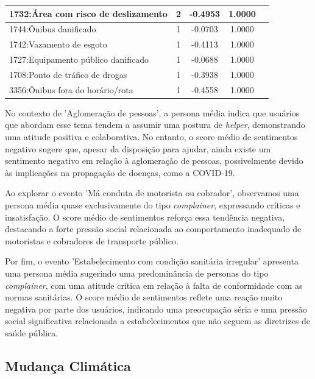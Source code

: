 \begin{table}[htbp]
\begin{tabular}{|l|c|c|c|c|}
		\hline
		1732:Área com risco de deslizamento                   & 2                & -0.4953        & 1.0000           \\
		\hline
		1744:Ônibus danificado                                & 1                & -0.0703        & 1.0000           \\
		\hline
		1742:Vazamento de esgoto                              & 1                & -0.4113        & 1.0000           \\
		\hline
		1727:Equipamento público danificado                   & 1                & -0.0688        & 1.0000           \\
		\hline
		1708:Ponto de tráfico de drogas                       & 1                & -0.3938        & 1.0000           \\
		\hline
		3356:Ônibus fora do horário/rota                      & 1                & -0.4558        & 1.0000           \\
		\hline
	\end{tabular}
\end{table}

No contexto de 'Aglomeração de pessoas', a persona média indica que usuários que abordam esse tema tendem a assumir uma postura de \textit{helper}, demonstrando uma atitude positiva e colaborativa. No entanto, o score médio de sentimentos negativo sugere que, apesar da disposição para ajudar, ainda existe um sentimento negativo em relação à aglomeração de pessoas, possivelmente devido às implicações na propagação de doenças, como a COVID-19.

Ao explorar o evento 'Má conduta de motorista ou cobrador', observamos uma persona média quase exclusivamente do tipo \textit{complainer}, expressando críticas e insatisfação. O score médio de sentimentos reforça essa tendência negativa, destacando a forte pressão social relacionada ao comportamento inadequado de motoristas e cobradores de transporte público.

Por fim, o evento 'Estabelecimento com condição sanitária irregular' apresenta uma persona média sugerindo uma predominância de personas do tipo \textit{complainer}, com uma atitude crítica em relação à falta de conformidade com as normas sanitárias. O score médio de sentimentos reflete uma reação muito negativa por parte dos usuários, indicando uma preocupação séria e uma pressão social significativa relacionada a estabelecimentos que não seguem as diretrizes de saúde pública.

\subsection{Mudança Climática}

